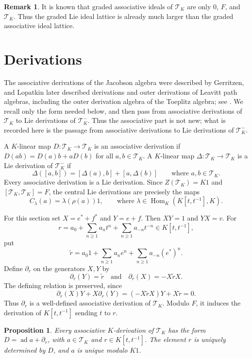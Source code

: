 \documentclass[11pt]{article}
\numberwithin{equation}{section}
\theoremstyle{plain}
\newtheorem{proposition}[theorem]{Proposition}
\theoremstyle{definition}
\newtheorem{remark}{Remark}
\numberwithin{equation}{section}
\newcommand{\T}{\mathscr T_K}
\begin{document}
\begin{remark}
It is known that graded associative ideals of $\T$ are only $0$, $F$, and $\T$. Thus the graded Lie ideal lattice is already much larger than the graded associative ideal lattice.
\end{remark}


\section{Derivations}

The associative derivations of the Jacobson algebra were described by Gerritzen, and Lopatkin later described derivations and outer derivations of Leavitt path algebras, including the outer derivation algebra of the Toeplitz algebra; see \cite{Gerritzen2000,Lopatkin2019}. We recall only the form needed below, and then pass from associative derivations of $\T$ to Lie derivations of $\T^-$. Thus the associative part is not new; what is recorded here is the passage from associative derivations to Lie derivations of $\T^-$.

A $K$-linear map $D:\T\to\T$ is an associative derivation if $D(ab)=D(a)b+aD(b)$ for all $a,b\in\T$. A $K$-linear map $\Delta:\T\to\T$ is a Lie derivation of $\T^-$ if
$$
\Delta([a,b])=[\Delta(a),b]+[a,\Delta(b)]
\qquad\text{where }a,b\in\T.
$$
Every associative derivation is a Lie derivation. Since $Z(\T)=K1$ and $[\T,\T]=F$, the central Lie derivations are precisely the maps
$$
C_\lambda(a)=\lambda(\rho(a))1,
\qquad \text{where }\lambda\in\operatorname{Hom}_K(K[t,t^{-1}],K).
$$

For this section set $X=e^*+f^*$ and $Y=e+f$. Then $XY=1$ and $YX=v$. For
$$
r=a_0+\sum_{n\geq1}a_nt^n+\sum_{n\geq1}a_{-n}t^{-n}\in K[t,t^{-1}],
$$
put
$$
\widetilde{r}=a_0 1+\sum_{n\geq1}a_ne^n+\sum_{n\geq1}a_{-n}(e^*)^n.
$$
Define $\partial_r$ on the generators $X,Y$ by
$$
\partial_r(Y)=\widetilde{r}\quad\text{and}\quad \partial_r(X)=-X\widetilde{r}X.
$$
The defining relation is preserved, since
$$
\partial_r(X)Y+X\partial_r(Y)=(-X\widetilde{r}X)Y+X\widetilde{r}=0.
$$
Thus $\partial_r$ is a well-defined associative derivation of $\T$. Modulo $F$, it induces the derivation of $K[t,t^{-1}]$ sending $t$ to $r$.


\begin{proposition}\label{prop:assoc-derivations-toeplitz}
Every associative $K$-derivation of $\T$ has the form $D=\operatorname{ad}a+\partial_r$, with $a\in\T$ and $r\in K[t,t^{-1}]$. The element $r$ is uniquely determined by $D$, and $a$ is unique modulo $K1$.
\end{proposition}
\end{document}
